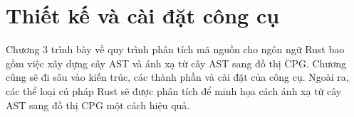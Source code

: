 \chapter{Thiết kế và cài đặt công cụ}
\label{chap:design}

Chương 3 trình bày về quy trình phân tích mã nguồn cho ngôn ngữ Rust bao gồm việc xây dựng cây AST và ánh xạ từ cây AST sang đồ thị CPG.
Chương cũng sẽ đi sâu vào kiến trúc, các thành phần và cài đặt của công cụ.
Ngoài ra, các thể loại cú pháp Rust sẽ được phân tích để minh họa cách ánh xạ từ cây AST sang đồ thị CPG một cách hiệu quả.





